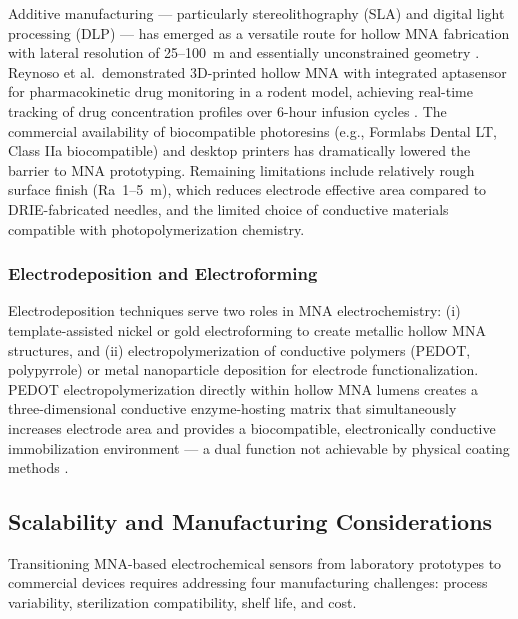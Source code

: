 \documentclass[review,1p]{elsarticle}
\begin{document}
Additive manufacturing — particularly stereolithography (SLA) and digital light processing (DLP) — has emerged as a versatile route for hollow MNA fabrication with lateral resolution of 25--100~\textmu{}m and essentially unconstrained geometry \cite{Reynoso2024}. Reynoso et al.\ demonstrated 3D-printed hollow MNA with integrated aptasensor for pharmacokinetic drug monitoring in a rodent model, achieving real-time tracking of drug concentration profiles over 6-hour infusion cycles \cite{Reynoso2024}. The commercial availability of biocompatible photoresins (e.g., Formlabs Dental LT, Class IIa biocompatible) and desktop printers has dramatically lowered the barrier to MNA prototyping. Remaining limitations include relatively rough surface finish (Ra~1--5~\textmu{}m), which reduces electrode effective area compared to DRIE-fabricated needles, and the limited choice of conductive materials compatible with photopolymerization chemistry.

\subsubsection{Electrodeposition and Electroforming}

Electrodeposition techniques serve two roles in MNA electrochemistry: (i) template-assisted nickel or gold electroforming to create metallic hollow MNA structures, and (ii) electropolymerization of conductive polymers (PEDOT, polypyrrole) or metal nanoparticle deposition for electrode functionalization. PEDOT electropolymerization directly within hollow MNA lumens creates a three-dimensional conductive enzyme-hosting matrix that simultaneously increases electrode area and provides a biocompatible, electronically conductive immobilization environment — a dual function not achievable by physical coating methods \cite{Sharma2022AFE}.

\subsection{Scalability and Manufacturing Considerations}
\label{subsec:scalability}

Transitioning MNA-based electrochemical sensors from laboratory prototypes to commercial devices requires addressing four manufacturing challenges: process variability, sterilization compatibility, shelf life, and cost.
\end{document}
